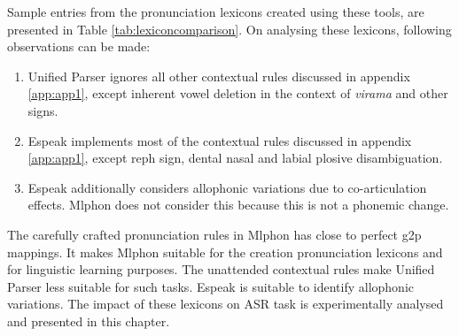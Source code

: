 Sample entries from the pronunciation lexicons created using these tools, are
presented in Table \ref{tab:lexiconcomparison}. On analysing these lexicons,
following observations can be made:

\begin{enumerate}
	\item Unified Parser ignores all other contextual rules discussed in appendix
	      \ref{app:app1}, except inherent vowel deletion in the context of \textit{virama}
	      and other signs.
	\item Espeak implements most of the contextual rules discussed in appendix \ref{app:app1},
	      except reph sign, dental nasal and labial plosive disambiguation.
	\item Espeak additionally considers allophonic variations due to co-articulation
	      effects. Mlphon does not consider this because this is not a phonemic change.
\end{enumerate}

The carefully crafted pronunciation rules in Mlphon has close to perfect \gls{g2p}
mappings. It makes Mlphon suitable for the creation pronunciation lexicons and
for linguistic learning purposes. The unattended contextual rules make Unified
Parser less suitable for such tasks. Espeak is suitable to identify allophonic
variations. The impact of these lexicons on ASR task is experimentally analysed
and presented in this chapter.

